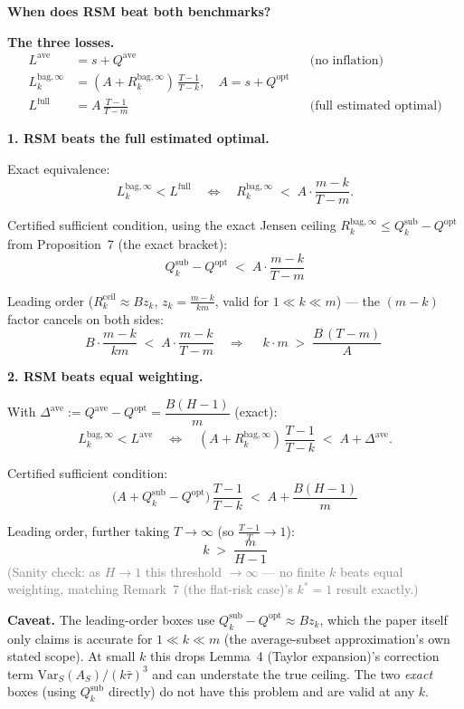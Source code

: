 \documentclass[preview,border=12pt]{standalone}
\newcommand{\Qopt}{Q^{\mathrm{opt}}}
\newcommand{\Qave}{Q^{\mathrm{ave}}}
\newcommand{\Qsub}{Q_k^{\mathrm{sub}}}
\newcommand{\Rk}{R_k^{\mathrm{bag},\infty}}
\newcommand{\zk}{z_k}
\begin{document}
\begin{minipage}{15cm}

{\Large\textbf{When does RSM beat both benchmarks?}}
\vspace{8pt}

\textbf{The three losses.}
\begin{align*}
  L^{\mathrm{ave}} &= s + \Qave &&\text{(no inflation)}\\[2pt]
  L_k^{\mathrm{bag},\infty} &= (A+\Rk)\,\frac{T-1}{T-k}, \quad A = s+\Qopt\\[2pt]
  L^{\mathrm{full}} &= A\,\frac{T-1}{T-m} &&\text{(full estimated optimal)}
\end{align*}

\vspace{4pt}
\textbf{1. RSM beats the full estimated optimal.}

Exact equivalence:
\[
  L_k^{\mathrm{bag},\infty} < L^{\mathrm{full}}
  \quad\Longleftrightarrow\quad
  \Rk \;<\; A\cdot\frac{m-k}{T-m}.
\]

Certified sufficient condition, using the exact Jensen ceiling
$\Rk\le\Qsub-\Qopt$ from Proposition~7 (the exact bracket):
\[
  \boxed{\;\Qsub-\Qopt \;<\; A\cdot\dfrac{m-k}{T-m}\;}
\]

Leading order ($R_k^{\mathrm{ceil}}\approx B\zk$, $\zk=\tfrac{m-k}{km}$, valid for
$1\ll k\ll m$) — the $(m-k)$ factor cancels on both sides:
\[
  B\cdot\frac{m-k}{km} \;<\; A\cdot\frac{m-k}{T-m}
  \quad\Longrightarrow\quad
  \boxed{\;k\cdot m \;>\; \dfrac{B\,(T-m)}{A}\;}
\]

\vspace{6pt}
\textbf{2. RSM beats equal weighting.}

With $\Delta^{\mathrm{ave}} := \Qave - \Qopt = \dfrac{B(H-1)}{m}$ (exact):
\[
  L_k^{\mathrm{bag},\infty} < L^{\mathrm{ave}}
  \quad\Longleftrightarrow\quad
  (A+\Rk)\,\frac{T-1}{T-k} \;<\; A + \Delta^{\mathrm{ave}}.
\]

Certified sufficient condition:
\[
  \boxed{\;\bigl(A + \Qsub - \Qopt\bigr)\,\dfrac{T-1}{T-k}
  \;<\; A + \dfrac{B(H-1)}{m}\;}
\]

Leading order, further taking $T\to\infty$ (so $\tfrac{T-1}{T}\to1$):
\[
  \boxed{\;k \;>\; \dfrac{m}{H-1}\;}
\]
\textcolor{gray}{\small (Sanity check: as $H\to1$ this threshold $\to\infty$ ---
no finite $k$ beats equal weighting, matching Remark~7 (the flat-risk case)'s
$k^*=1$ result exactly.)}

\vspace{6pt}
\textbf{Caveat.} The leading-order boxes use $\Qsub-\Qopt\approx B\zk$,
which the paper itself only claims is accurate for $1\ll k\ll m$
(the average-subset approximation's own stated scope). At small $k$ this drops
Lemma~4 (Taylor expansion)'s correction term
$\mathrm{Var}_S(A_S)/(k\bar\tau)^3$ and can understate the true ceiling.
The two \emph{exact} boxes (using $\Qsub$ directly) do not have this
problem and are valid at any $k$.

\end{minipage}
\end{document}
